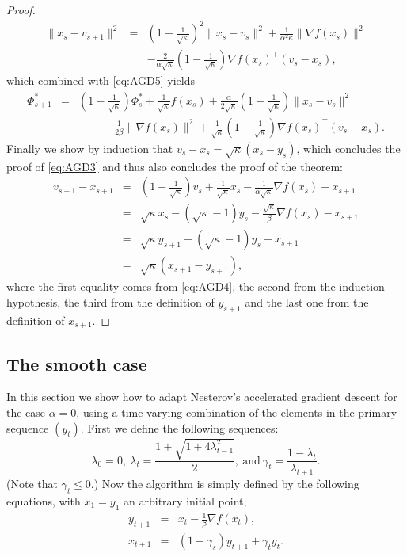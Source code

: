 \begin{proof}
\begin{eqnarray*}
\|x_s - v_{s+1}\|^2 & = & \left(1 - \frac{1}{\sqrt{\kappa}}\right)^2 \|x_s - v_s\|^2 + \frac{1}{\alpha^2 \kappa} \|\nabla f(x_s)\|^2 \\
& & - \frac{2}{\alpha \sqrt{\kappa}} \left(1 - \frac{1}{\sqrt{\kappa}}\right) \nabla f(x_s)^{\top}(v_s-x_s) ,
\end{eqnarray*}
which combined with \eqref{eq:AGD5} yields
\begin{eqnarray*}
\Phi_{s+1}^* & = & \left(1 - \frac{1}{\sqrt{\kappa}}\right) \Phi_s^* + \frac{1}{\sqrt{\kappa}} f(x_s) + \frac{\alpha}{2 \sqrt{\kappa}} \left(1 - \frac{1}{\sqrt{\kappa}}\right) \|x_s - v_s\|^2 \\
& & \qquad - \frac{1}{2 \beta} \| \nabla f(x_s) \|^2 + \frac{1}{\sqrt{\kappa}} \left(1 - \frac{1}{\sqrt{\kappa}}\right) \nabla f(x_s)^{\top}(v_s-x_s) .
\end{eqnarray*}
Finally we show by induction that $v_s - x_s = \sqrt{\kappa}(x_s - y_s)$, which concludes the proof of \eqref{eq:AGD3} and thus also concludes the proof of the theorem:
\begin{eqnarray*}
v_{s+1} - x_{s+1} & = & \left(1 - \frac{1}{\sqrt{\kappa}}\right) v_s + \frac{1}{\sqrt{\kappa}} x_s - \frac{1}{\alpha \sqrt{\kappa}} \nabla f(x_s) - x_{s+1} \\
& = & \sqrt{\kappa} x_s - (\sqrt{\kappa}-1) y_s - \frac{\sqrt{\kappa}}{\beta} \nabla f(x_s) - x_{s+1} \\
& = & \sqrt{\kappa} y_{s+1} - (\sqrt{\kappa}-1) y_s - x_{s+1} \\
& = & \sqrt{\kappa} (x_{s+1} - y_{s+1}) ,
\end{eqnarray*}
where the first equality comes from \eqref{eq:AGD4}, the second from the induction hypothesis, the third from the definition of $y_{s+1}$ and the last one from the definition of $x_{s+1}$.
\end{proof}

\subsection{The smooth case}
In this section we show how to adapt Nesterov's accelerated gradient descent for the case $\alpha=0$, using a time-varying combination of the elements in the primary sequence $(y_t)$. First we define the following sequences:
$$\lambda_0 = 0, \ \lambda_{t} = \frac{1 + \sqrt{1+ 4 \lambda_{t-1}^2}}{2}, \ \text{and} \  \gamma_t = \frac{1 - \lambda_t}{\lambda_{t+1}}.$$
(Note that $\gamma_t \leq 0$.) Now the algorithm is simply defined by the following equations, with $x_1 = y_1$ an arbitrary initial point,
\begin{eqnarray*}
y_{t+1} & = & x_t  - \frac{1}{\beta} \nabla f(x_t) , \\
x_{t+1} & = & (1 - \gamma_s) y_{t+1} + \gamma_t y_t .
\end{eqnarray*}

